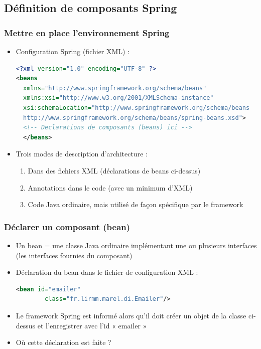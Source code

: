 \documentclass{beamer}
\begin{document}
\subsection{Définition de composants Spring}

\begin{frame}[fragile]
  \frametitle{Mettre en place l'environnement Spring}  
  \begin{itemize}
  \item Configuration Spring (fichier XML) :
    
    \begin{lstlisting}[language=XML,basicstyle=\scriptsize]
<?xml version="1.0" encoding="UTF-8" ?>
<beans
  xmlns="http://www.springframework.org/schema/beans"
  xmlns:xsi="http://www.w3.org/2001/XMLSchema-instance"
  xsi:schemaLocation="http://www.springframework.org/schema/beans
  http://www.springframework.org/schema/beans/spring-beans.xsd">
  <!-- Declarations de composants (beans) ici -->
  </beans>
  \end{lstlisting}
    
  \item Trois modes de description d'architecture :
    \begin{enumerate}
    \item Dans des fichiers XML (déclarations de beans ci-dessus)
    \item Annotations dans le code (avec un minimum d'XML)
    \item Code Java ordinaire, mais utilisé de façon spécifique
      par le framework
    \end{enumerate}
  \end{itemize}
\end{frame}

\begin{frame}[fragile]
  \frametitle{Déclarer un composant (bean)}
  \begin{itemize}
  \item Un bean = une classe Java ordinaire implémentant une ou
    plusieurs interfaces (les interfaces fournies du composant)
  \item Déclaration du bean dans le fichier de configuration XML :
\begin{lstlisting}[language=XML]    
  <bean id="emailer"
        class="fr.lirmm.marel.di.Emailer"/>
\end{lstlisting}  
\item Le framework Spring est informé alors qu'il doit créer un objet
  de la classe ci-dessus et l'enregistrer avec l'id « emailer »
\item Où cette déclaration est faite ?
  \end{itemize}
\end{frame}
\end{document}
